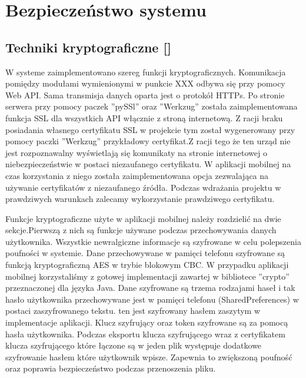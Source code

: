 \newpage\section{Bezpieczeństwo systemu \textsl{\NazwaSys}} \label{sec:bezpieczenstwo}
\subsection[Techniki kryptograficzne]{Techniki kryptograficzne [\StudentB]}
W systeme \textsl{\NazwaSys} zaimplementowano szereg funkcji kryptograficznych. Komunikacja pomiędzy modułami wymienionymi w punkcie XXX odbywa się przy pomocy Web API. Sama transmisja danych oparta jest o protokół HTTPs. Po stronie serwera przy pomocy paczek ''pySSl'' oraz ''Werkzug'' została zaimplementowana funkcja SSL dla wszystkich API włącznie z stroną internetową. Z racji braku posiadania własnego certyfikatu SSL w projekcie tym został wygenerowany przy pomocy paczki ''Werkzug'' przykładowy certyfikat.Z racji tego że ten urząd nie jest rozpoznawalny wyświetlają się komunikaty na stronie internetowej o niebezpieczeństwie w postaci niezaufanego certyfikatu. W aplikacji mobilnej na czas korzystania z niego została zaimplementowana opcja zezwalająca na używanie certyfikatów z niezaufanego źródła. Podczas wdrażania projektu w prawdziwych warunkach zalecamy wykorzystanie prawdziwego certyfikatu.

Funkcje kryptograficzne użyte w aplikacji mobilnej należy rozdzielić na dwie sekcje.Pierwszą z nich są funkcje używane podczas przechowywania danych użytkownika. Wszystkie newralgiczne informacje są szyfrowane w celu polepszenia poufności w systemie. Dane przechowywane w pamięci telefonu szyfrowane są funkcją kryptograficzną AES w trybie blokowym CBC. W przypadku aplikacji mobilnej korzystaliśmy z gotowej implementacji zawartej w bibliotece ''crypto'' przeznaczonej dla języka Java. Dane szyfrowane są trzema rodzajami haseł i tak hasło użytkownika przechowywane jest w pamięci telefonu (SharedPreferences) w postaci zaszyfrowanego tekstu.  ten jest szyfrowany hasłem zaszytym w implementacje aplikacji. Klucz szyfrujący oraz token szyfrowane są za pomocą hasła użytkownika. Podczas eksportu klucza szyfrującego wraz z certyfikatem klucza szyfrującego które łączone są w jeden plik   występuje dodatkowe szyfrowanie hasłem które użytkownik wpisze. Zapewnia to zwiększoną poufność oraz poprawia bezpieczeństwo podczas przenoszenia pliku.                

